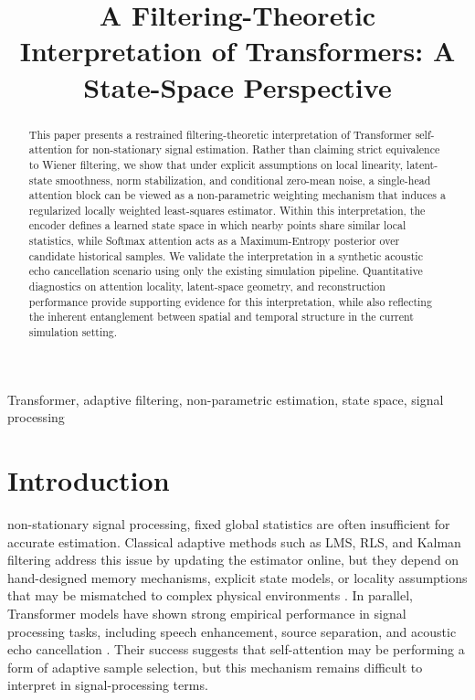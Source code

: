 \documentclass[conference]{IEEEtran}
\begin{document}
\title{A Filtering-Theoretic Interpretation of Transformers: A State-Space Perspective}

\author{
}

\maketitle

\begin{abstract}
This paper presents a restrained filtering-theoretic interpretation of Transformer self-attention for non-stationary signal estimation. Rather than claiming strict equivalence to Wiener filtering, we show that under explicit assumptions on local linearity, latent-state smoothness, norm stabilization, and conditional zero-mean noise, a single-head attention block can be viewed as a non-parametric weighting mechanism that induces a regularized locally weighted least-squares estimator. Within this interpretation, the encoder defines a learned state space in which nearby points share similar local statistics, while Softmax attention acts as a Maximum-Entropy posterior over candidate historical samples. We validate the interpretation in a synthetic acoustic echo cancellation scenario using only the existing simulation pipeline. Quantitative diagnostics on attention locality, latent-space geometry, and reconstruction performance provide supporting evidence for this interpretation, while also reflecting the inherent entanglement between spatial and temporal structure in the current simulation setting.
\end{abstract}

\begin{IEEEkeywords}
Transformer, adaptive filtering, non-parametric estimation, state space, signal processing
\end{IEEEkeywords}

\section{Introduction}
 non-stationary signal processing, fixed global statistics are often insufficient for accurate estimation. Classical adaptive methods such as LMS, RLS, and Kalman filtering address this issue by updating the estimator online, but they depend on hand-designed memory mechanisms, explicit state models, or locality assumptions that may be mismatched to complex physical environments \cite{haykin2002adaptive, sayed2003fundamentals, kalman1960new}. In parallel, Transformer models have shown strong empirical performance in signal processing tasks, including speech enhancement, source separation, and acoustic echo cancellation \cite{vaswani2017attention, wang2020complex, subakan2021attention, zhang2022multi}. Their success suggests that self-attention may be performing a form of adaptive sample selection, but this mechanism remains difficult to interpret in signal-processing terms.
\end{document}
